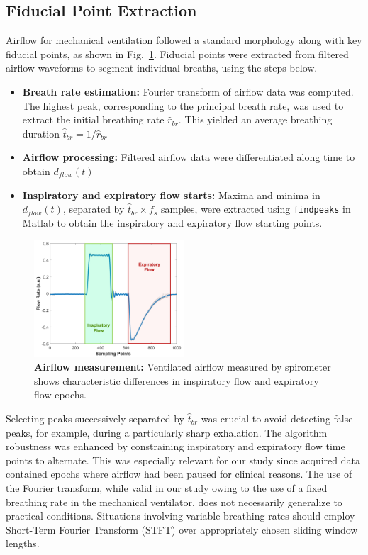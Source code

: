 \documentclass[journal]{IEEEtran}
\begin{document}
\subsection{Fiducial Point Extraction} \label{sec:fiducial}
Airflow for mechanical ventilation followed a standard morphology along with key fiducial points, as shown in Fig.~\ref{fig:airflow}. Fiducial points were extracted from filtered airflow waveforms to segment individual breaths, using the steps below. 
\begin{itemize}
    \item \textbf{Breath rate estimation:} Fourier transform of airflow data was computed. The highest peak, corresponding to the principal breath rate, was used to extract the initial breathing rate $\hat{r}_{br}$. This yielded an average breathing duration $\hat{t}_{br} = 1/\hat{r}_{br}$
    \item \textbf{Airflow processing:} Filtered airflow data were differentiated along time to obtain $d_{flow}(t)$ 
    \item \textbf{Inspiratory and expiratory flow starts:} Maxima and minima in $d_{flow}(t)$, separated by $\hat{t}_{br} \times f_{s}$ samples, were extracted using \texttt{findpeaks} in Matlab to obtain the inspiratory and expiratory flow starting points. 
\end{itemize}
\begin{figure}[htpb]
    \centering
    \includegraphics[width=0.5\textwidth]{airflow.jpg}
    \caption{\textbf{Airflow measurement:} Ventilated airflow measured by spirometer shows characteristic differences in inspiratory flow and expiratory flow epochs.}
    \label{fig:airflow}
\end{figure}
Selecting peaks successively separated by $\hat{t}_{br}$ was crucial to avoid detecting false peaks, for example, during a particularly sharp exhalation. The algorithm robustness was enhanced by constraining inspiratory and expiratory flow time points to alternate. This was especially relevant for our study since acquired data contained epochs where airflow had been paused for clinical reasons. The use of the Fourier transform, while valid in our study owing to the use of a fixed breathing rate in the mechanical ventilator, does not necessarily generalize to practical conditions. Situations involving variable breathing rates should employ Short-Term Fourier Transform (STFT) over appropriately chosen sliding window lengths.
\end{document}
